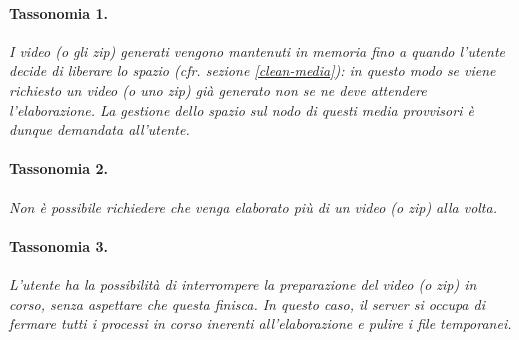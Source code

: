 \begin{shaded}
    \vspace{-12pt}
    \paragraph{Tassonomia 1.}
    \emph{I video (o gli zip) generati vengono mantenuti in memoria fino a quando l'utente decide di liberare lo spazio (cfr. sezione \ref{clean-media}): in questo modo se viene richiesto un video (o uno zip) già generato non se ne deve attendere l'elaborazione. La gestione dello spazio sul nodo di questi media provvisori è dunque demandata all'utente.}
    \paragraph{Tassonomia 2.}
    \emph{Non è possibile richiedere che venga elaborato più di un video (o zip) alla volta.}
    \paragraph{Tassonomia 3.}
    \emph{L'utente ha la possibilità di interrompere la preparazione del video (o zip) in corso, senza aspettare che questa finisca. In questo caso, il server si occupa di fermare tutti i processi in corso inerenti all'elaborazione e pulire i file temporanei.}
\end{shaded}

